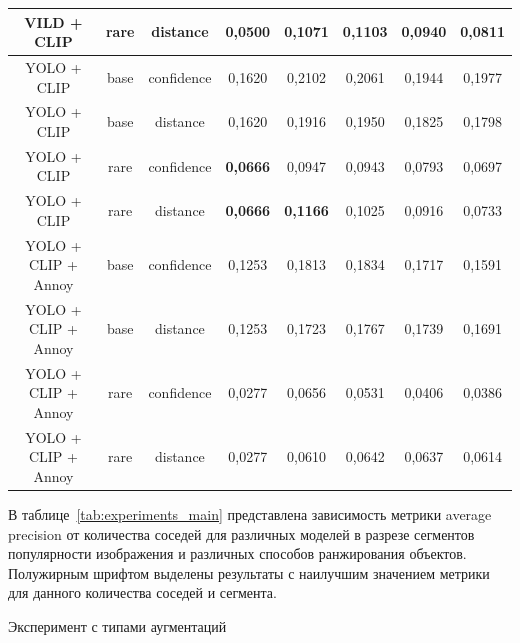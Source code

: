 \documentclass[a4paper,14pt]{article}
\begin{document}
\begin{landscape}
\begin{table}[H]
\begin{tabular}{ccc|ccccc|}
                VILD + CLIP         & rare    & distance   & 0,0500          & 0,1071          & 0,1103          & 0,0940          & 0,0811          \\ \hline
                YOLO + CLIP         & base    & confidence & 0,1620          & 0,2102          & 0,2061          & 0,1944          & 0,1977          \\
                YOLO + CLIP         & base    & distance   & 0,1620          & 0,1916          & 0,1950          & 0,1825          & 0,1798          \\
                YOLO + CLIP         & rare    & confidence & \textbf{0,0666} & 0,0947          & 0,0943          & 0,0793          & 0,0697          \\
                YOLO + CLIP         & rare    & distance   & \textbf{0,0666} & \textbf{0,1166} & 0,1025          & 0,0916          & 0,0733          \\ \hline
                YOLO + CLIP + Annoy & base    & confidence & 0,1253          & 0,1813          & 0,1834          & 0,1717          & 0,1591          \\
                YOLO + CLIP + Annoy & base    & distance   & 0,1253          & 0,1723          & 0,1767          & 0,1739          & 0,1691          \\
                YOLO + CLIP + Annoy & rare    & confidence & 0,0277          & 0,0656          & 0,0531          & 0,0406          & 0,0386          \\
                YOLO + CLIP + Annoy & rare    & distance   & 0,0277          & 0,0610          & 0,0642          & 0,0637          & 0,0614          \\
                \bottomrule
            \end{tabular}
        \end{table}

        В таблице~\ref{tab:experiments_main} представлена зависимость метрики average precision от количества соседей
        для различных моделей в разрезе сегментов популярности изображения и различных способов ранжирования объектов.
        Полужирным шрифтом выделены результаты с наилучшим значением метрики для данного количества соседей и сегмента.
    
        \begin{table}[H]
    	\centering
    	\caption{Эксперимент с типами аугментаций}
    	\label{tab:exp_base}
    	

\end{table}
\end{landscape}
\end{document}

